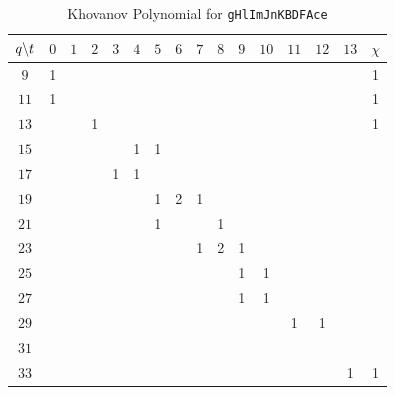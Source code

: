 \documentclass{article}
\theoremstyle{plain}
\begin{document}
        \begin{table}[H]
            \centering
            \begin{tabular}{| c | c | c | c | c | c | c | c | c | c | c | c | c | c | c | c |}
                \hline
                $q\symbol{92}t$&$0$&$1$&$2$&$3$&$4$&$5$&$6$&$7$&$8$&$9$&$10$&$11$&$12$&$13$&$\chi$\\
                \hline
                $9$&1&&&&&&&&&&&&&&1\\
                \hline
                $11$&1&&&&&&&&&&&&&&1\\
                \hline
                $13$&&&1&&&&&&&&&&&&1\\
                \hline
                $15$&&&&&1&1&&&&&&&&&\\
                \hline
                $17$&&&&1&1&&&&&&&&&&\\
                \hline
                $19$&&&&&&1&2&1&&&&&&&\\
                \hline
                $21$&&&&&&1&&&1&&&&&&\\
                \hline
                $23$&&&&&&&&1&2&1&&&&&\\
                \hline
                $25$&&&&&&&&&&1&1&&&&\\
                \hline
                $27$&&&&&&&&&&1&1&&&&\\
                \hline
                $29$&&&&&&&&&&&&1&1&&\\
                \hline
                $31$&&&&&&&&&&&&&&&\\
                \hline
                $33$&&&&&&&&&&&&&&1&1\\
                \hline
            \end{tabular}
            \caption{Khovanov Polynomial for \texttt{gHlImJnKBDFAce}}
            \label{table:t_gHlImJnKBDFAce_kho}
        \end{table}
    \newpage
\end{document}
